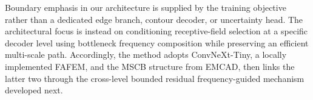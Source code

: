 Boundary emphasis in our architecture is supplied by the training objective rather
than a dedicated edge branch, contour decoder, or uncertainty head. The architectural
focus is instead on conditioning receptive-field selection at a specific decoder level
using bottleneck frequency composition while preserving an efficient multi-scale path.
Accordingly, the method adopts ConvNeXt-Tiny, a locally implemented FAFEM, and the
MSCB structure from EMCAD, then links the latter two through the cross-level bounded
residual frequency-guided mechanism developed next.
